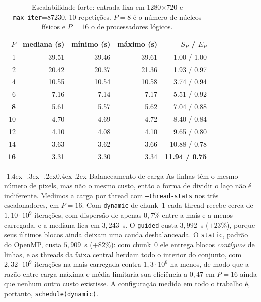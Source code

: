 \documentclass[10pt,a4paper]{article}
\makeatletter
\renewcommand\section{\@startsection{section}{1}{\z@}%
  {-1.4ex \@plus -.3ex \@minus -.2ex}{0.4ex \@plus .2ex}%
  {\normalfont\normalsize\bfseries}}
\makeatother
\begin{document}
\begin{table}[htbp]
\centering\scriptsize
\caption{\small Escalabilidade forte: entrada fixa em 1280$\times$720 e \texttt{max\_iter}=87230, 10 repetições. $P=8$ é o número de núcleos físicos e $P=16$ o de processadores lógicos.}
\label{tab:forte}
\begin{tabular}{rrrrr}\toprule
$P$ & mediana (s) & mínimo (s) & máximo (s) & $S_P$ / $E_P$\\\midrule
1  & 39.51 & 39.46 & 39.61 & 1.00 / 1.00\\
2  & 20.42 & 20.37 & 21.36 & 1.93 / 0.97\\
4  & 10.55 & 10.54 & 10.58 & 3.74 / 0.94\\
6  &  7.16 &  7.14 &  7.17 & 5.51 / 0.92\\
\textbf{8}  &  5.61 &  5.57 &  5.62 & 7.04 / 0.88\\
10 &  4.70 &  4.69 &  4.72 & 8.40 / 0.84\\
12 &  4.10 &  4.08 &  4.10 & 9.65 / 0.80\\
14 &  3.63 &  3.62 &  3.66 & 10.88 / 0.78\\
\textbf{16} &  3.31 &  3.30 &  3.34 & \textbf{11.94 / 0.75}\\
\bottomrule
\end{tabular}
\end{table}

\section{Balanceamento de carga}
As linhas têm o mesmo número de pixels, mas não o mesmo custo, então a forma de dividir o laço não é indiferente. Medimos a carga por thread com \texttt{--thread-stats} nos três escalonadores, em $P=16$. Com \texttt{dynamic} de chunk~1 cada thread recebe cerca de $1{,}10\cdot10^{9}$ iterações, com dispersão de apenas $0{,}7\%$ entre a mais e a menos carregada, e a mediana fica em $3{,}243$~s. O \texttt{guided} custa $3{,}992$~s ($+23\%$), porque seus últimos blocos ainda deixam uma cauda desbalanceada. O \texttt{static}, padrão do OpenMP, custa $5{,}909$~s ($+82\%$): com chunk~0 ele entrega blocos \emph{contíguos} de linhas, e as threads da faixa central herdam todo o interior do conjunto, com $2{,}32\cdot10^{9}$ iterações na mais carregada contra $1{,}3\cdot10^{6}$ na menos, de modo que a razão entre carga máxima e média limitaria sua eficiência a $0{,}47$ em $P=16$ ainda que nenhum outro custo existisse. A configuração medida em todo o trabalho é, portanto, \texttt{schedule(dynamic)}.
\end{document}
